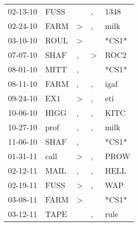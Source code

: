 \begin{supertabular}{p{0.07\textwidth}p{0.06\textwidth}p{0.02\textwidth}p{0.02\textwidth}p{0.06\textwidth}}
          02-13-10\textsuperscript{} &           FUSS\textsuperscript{} &                  &             , &           1348\textsuperscript{} \\
          02-24-10\textsuperscript{} &           FARM\textsuperscript{} &     \textgreater &             , &           milk\textsuperscript{} \\
          03-10-10\textsuperscript{} &           ROUL\textsuperscript{} &     \textgreater &               &                            *CS1* \\
          07-07-10\textsuperscript{} &           SHAF\textsuperscript{} &                , &  \textgreater &           ROC2\textsuperscript{} \\
          08-01-10\textsuperscript{} &           MITT\textsuperscript{} &                , &               &                            *CS1* \\
          08-11-10\textsuperscript{} &           FARM\textsuperscript{} &                , &             , &           igaf\textsuperscript{} \\
          09-24-10\textsuperscript{} &            EX1\textsuperscript{} &     \textgreater &             , &            eti\textsuperscript{} \\
          10-06-10\textsuperscript{} &           HIGG\textsuperscript{} &                , &             , &           KITC\textsuperscript{} \\
          10-27-10\textsuperscript{} &           prof\textsuperscript{} &                , &             , &           milk\textsuperscript{} \\
          11-06-10\textsuperscript{} &           SHAF\textsuperscript{} &                , &               &                            *CS1* \\
          01-31-11\textsuperscript{} &           call\textsuperscript{} &     \textgreater &             , &           PROW\textsuperscript{} \\
          02-12-11\textsuperscript{} &           MAIL\textsuperscript{} &                , &             , &           HELL\textsuperscript{} \\
          02-19-11\textsuperscript{} &           FUSS\textsuperscript{} &     \textgreater &             , &            WAP\textsuperscript{} \\
          03-08-11\textsuperscript{} &           FARM\textsuperscript{} &     \textgreater &               &                            *CS1* \\
          03-12-11\textsuperscript{} &           TAPE\textsuperscript{} &                  &             , &           rule\textsuperscript{} \\

\end{supertabular}
